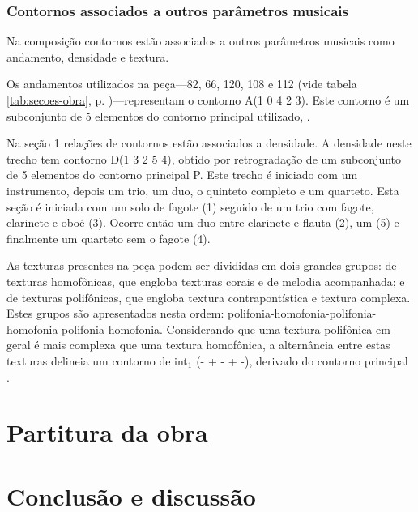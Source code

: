 
\subsection{Contornos associados a outros parâmetros musicais}
\label{sec:cont-assoc-outr}

Na composição \obra{} contornos estão associados a outros parâmetros
musicais como andamento, densidade e textura.

Os andamentos utilizados na peça---82, 66, 120, 108 e 112 (vide tabela
\ref{tab:secoes-obra}, p. \pageref{tab:secoes-obra})---representam o
contorno A(1 0 4 2 3). Este contorno é um subconjunto de 5 elementos
do contorno principal utilizado, \contpr{}.

Na seção 1 relações de contornos estão associados a densidade. A
densidade neste trecho tem contorno D(1 3 2 5 4), obtido por
retrogradação de um subconjunto de 5 elementos do contorno principal
P. Este trecho é iniciado com um instrumento, depois um trio, um duo,
o quinteto completo e um quarteto. Esta seção é iniciada com um solo
de fagote (1) seguido de um trio com fagote, clarinete e oboé
(3). Ocorre então um duo entre clarinete e flauta (2), um 
(5) e finalmente um quarteto sem o fagote (4).

As texturas presentes na peça podem ser divididas em dois grandes
grupos: de texturas homofônicas, que engloba texturas corais e de
melodia acompanhada; e de texturas polifônicas, que engloba textura
contrapontística e textura complexa. Estes grupos são apresentados
nesta ordem:
polifonia-homofonia-polifonia-homofonia-polifonia-homofonia. Considerando
que uma textura polifônica em geral é mais complexa que uma textura
homofônica, a alternância entre estas texturas delineia um contorno de
int$_1$ (- + - + -), derivado do contorno principal \contpr{}.

\chapter{Partitura da obra \obra{}}
\label{cha:partitura-da-obra}



\chapter{Conclusão e discussão}
\label{cha:conclusao-e-discussao}

